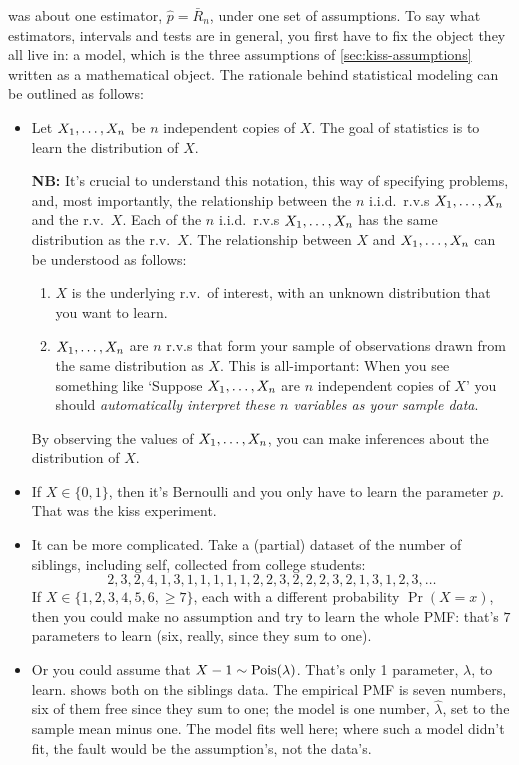  was about one estimator, $\hat{p} = \bar{R}_n$, under one set of assumptions.
To say what estimators, intervals and tests are in general, you first have to fix the object they all live in: a model, which is the three assumptions of \cref{sec:kiss-assumptions} written as a mathematical object.
The rationale behind statistical modeling can be outlined as follows:
\begin{itemize}
\item Let $X_1, \ldots, X_n$ be $n$ independent copies of $X$.
The goal of statistics is to learn the distribution of $X$.

\textbf{NB:} It's crucial to understand this notation, this way of specifying problems, and, most importantly, the relationship between the $n$ i.i.d.\ r.v.s $X_1, \ldots, X_n$ and the r.v.\ $X$.
Each of the $n$ i.i.d.\ r.v.s $X_1, \ldots, X_n$ has the same distribution as the r.v.\ $X$.
The relationship between $X$ and $X_1, \ldots, X_n$ can be understood as follows:
\begin{enumerate}[nosep]
\item $X$ is the underlying r.v.\ of interest, with an unknown distribution that you want to learn.
\item $X_1, \ldots, X_n$ are $n$ r.v.s that form your sample of observations drawn from the same distribution as $X$.
This is all-important: When you see something like `Suppose $X_1, \ldots, X_n$ are $n$ independent copies of $X$' you should \textit{automatically interpret these $n$ variables as your sample data}.
\end{enumerate}
By observing the values of $X_1, \ldots, X_n$, you can make inferences about the distribution of $X$.

\item If $X \in \{0,1\}$, then it's Bernoulli and you only have to learn the parameter $p$.
That was the kiss experiment.

\item It can be more complicated.
Take a (partial) dataset of the number of siblings, including self, collected from college students:
\[
2, 3, 2, 4, 1, 3, 1, 1, 1, 1, 1, 2, 2, 3, 2, 2, 2, 3, 2, 1, 3, 1, 2, 3, \ldots
\]
If $X \in \{1, 2, 3, 4, 5, 6, \geq 7\}$, each with a different probability $\Pr(X = x)$, then you could make no assumption and try to learn the whole PMF: that's $7$ parameters to learn (six, really, since they sum to one).

\item Or you could assume that $X - 1 \sim \text{Pois}(\lambda)$.
That's only 1 parameter, $\lambda$, to learn.
 shows both on the siblings data.
The empirical PMF is seven numbers, six of them free since they sum to one; the model is one number, $\hat\lambda$, set to the sample mean minus one.
The model fits well here; where such a model didn't fit, the fault would be the assumption's, not the data's.


\end{itemize}
